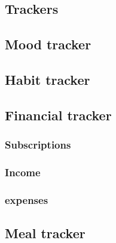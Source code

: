 \documentclass[a4paper]{article}
\begin{document}
\begin{itemize}
\section{Trackers}
\subsection{Mood tracker}
\newpage
\subsection{Habit tracker}
\newpage
\subsection{Financial tracker}
\subsubsection{Subscriptions}
\subsubsection{Income}
\subsubsection{expenses}
\newpage
\subsection{Meal tracker}

\end{itemize}
\end{document}
